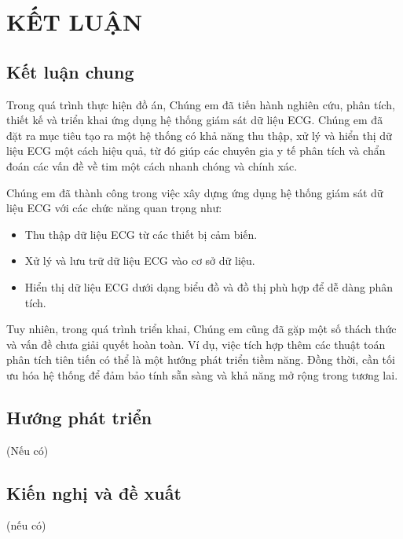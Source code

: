
\section*{KẾT LUẬN}
\subsection*{Kết luận chung}


Trong quá trình thực hiện đồ án, Chúng em đã tiến hành nghiên cứu, phân tích, thiết kế và triển khai ứng dụng hệ thống giám sát dữ liệu ECG. Chúng em đã đặt ra mục tiêu tạo ra một hệ thống có khả năng thu thập, xử lý và hiển thị dữ liệu ECG một cách hiệu quả, từ đó giúp các chuyên gia y tế phân tích và chẩn đoán các vấn đề về tim một cách nhanh chóng và chính xác.

Chúng em đã thành công trong việc xây dựng ứng dụng hệ thống giám sát dữ liệu ECG với các chức năng quan trọng như:


\begin{adjustwidth}{2em}{}
  \begin{itemize}
      \item Thu thập dữ liệu ECG từ các thiết bị cảm biến.
  
      \item Xử lý và lưu trữ dữ liệu ECG vào cơ sở dữ liệu.
  
      \item Hiển thị dữ liệu ECG dưới dạng biểu đồ và đồ thị phù hợp để dễ dàng phân tích.

    \end{itemize}
  \end{adjustwidth}


Tuy nhiên, trong quá trình triển khai, Chúng em cũng đã gặp một số thách thức và vấn đề chưa giải quyết hoàn toàn. Ví dụ, việc tích hợp thêm các thuật toán phân tích tiên tiến có thể là một hướng phát triển tiềm năng. Đồng thời, cần tối ưu hóa hệ thống để đảm bảo tính sẵn sàng và khả năng mở rộng trong tương lai.

\subsection*{Hướng phát triển}
(Nếu có)
\subsection*{Kiến nghị và đề xuất}
(nếu có)

\cleardoublepage